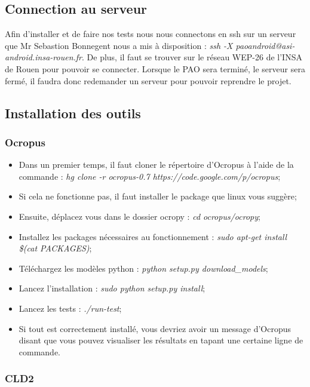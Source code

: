 \subsection{Connection au serveur}

Afin d'installer et de faire nos tests nous nous connectons en ssh sur un serveur que Mr Sebastion Bonnegent nous a mis à disposition : \textit{ssh -X paoandroid@asi-android.insa-rouen.fr}.
De plus, il faut se trouver sur le réseau WEP-26 de l'INSA de Rouen pour pouvoir se connecter. Lorsque le PAO sera terminé, le serveur sera fermé, il faudra donc redemander un serveur pour pouvoir reprendre le projet.

\subsection{Installation des outils}

\subsubsection{Ocropus}

\begin{itemize}
 \item Dans un premier temps, il faut cloner le répertoire d'Ocropus à l'aide de la commande : \textit{hg clone -r ocropus-0.7 https://code.google.com/p/ocropus};
 \item Si cela ne fonctionne pas, il faut installer le package que linux vous suggère;
 \item Ensuite, déplacez vous dans le dossier ocropy : \textit{cd ocropus/ocropy};
 \item Installez les packages nécessaires au fonctionnement : \textit{sudo apt-get install \$(cat PACKAGES)};
 \item Téléchargez les modèles python : \textit{python setup.py download\_models};
 \item Lancez l'installation : \textit{sudo python setup.py install};
 \item Lancez les tests : \textit{./run-test};
 \item Si tout est correctement installé, vous devriez avoir un message d'Ocropus disant que vous pouvez visualiser les résultats en tapant une certaine ligne de commande.
\end{itemize}

\subsubsection{CLD2}

